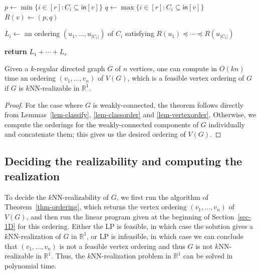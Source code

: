 \begin{algorithm}[htbp]
    \caption{\textsc{VertexOrder}$(G,(C_1,\dots,C_r))$}
    \begin{algorithmic}[1]
            \State $p \leftarrow \min\{i \in [r]: C_i \subseteq \mathsf{in}[v]\}$
            \State $q \leftarrow \max\{i \in [r]: C_i \subseteq \mathsf{in}[v]\}$
            \State $R(v) \leftarrow (p,q)$
            \begin{nolinenumbers}
            \end{nolinenumbers}
        \EndFor
            \State $L_i \leftarrow$ an ordering $(u_1,\dots,u_{|C_i|})$ of $C_i$ satisfying $R(u_1) \preceq \cdots \preceq R(u_{|C_i|})$
            \begin{nolinenumbers}
            \end{nolinenumbers}
        \EndFor
        \State \textbf{return} $L_1+\cdots+L_r$
    \end{algorithmic}
    \label{alg-vertexorder}
\end{algorithm}

\begin{theorem} \label{thm-ordering}
Given a $k$-regular directed graph $G$ of $n$ vertices, one can compute in $O(kn)$ time an ordering $(v_1,\dots,v_n)$ of $V(G)$, which is a feasible vertex ordering of $G$ if $G$ is $k$NN-realizable in $\mathbb{R}^1$.
\end{theorem}
\begin{proof}
For the case where $G$ is weakly-connected, the theorem follows directly from Lemmas~\ref{lem-classify}, \ref{lem-classorder} and \ref{lem-vertexorder}.
Otherwise, we compute the orderings for the weakly-connected components of $G$ individually and concatenate them; this gives us the desired ordering of $V(G)$.
\end{proof}

\subsection{Deciding the realizability and computing the realization}

To decide the $k$NN-realizability of $G$, we first run the algorithm of Theorem~\ref{thm-ordering}, which returns the vertex ordering $(v_1,\dots,v_n)$ of $V(G)$, and then run the linear program given at the beginning of Section~\ref{sec-1D} for this ordering.
Either the LP is feasible, in which case the solution gives a $k$NN-realization of $G$ in $\mathbb{R}^1$, or LP is infeasible, in which case we can conclude that $(v_1,\dots,v_n)$ is not a feasible vertex ordering and thus $G$ is not $k$NN-realizable in $\mathbb{R}^1$. Thus, the $k$NN-realization problem in $\mathbb{R}^1$ can be solved in polynomial time.


